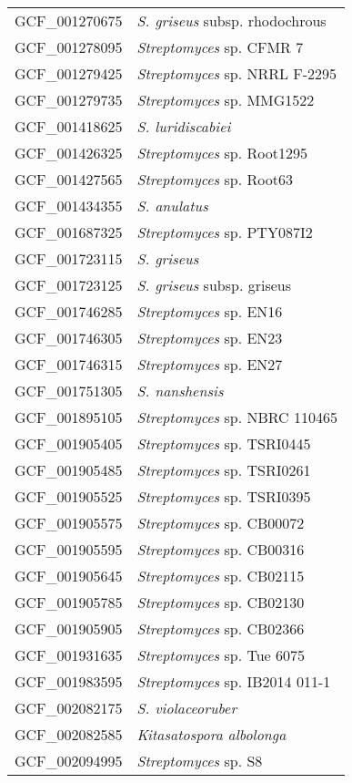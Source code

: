 \begin{longtable}{p{0.5\asdf}p{0.5\asdf}}
	GCF\_001270675 	&	\emph{S. griseus} subsp. rhodochrous	\\
	GCF\_001278095 	&	\emph{Streptomyces} sp. CFMR 7	\\
	GCF\_001279425 	&	\emph{Streptomyces} sp. NRRL F-2295	\\
	GCF\_001279735 	&	\emph{Streptomyces} sp. MMG1522	\\
	GCF\_001418625 	&	\emph{S. luridiscabiei}	\\
	GCF\_001426325 	&	\emph{Streptomyces} sp. Root1295	\\
	GCF\_001427565 	&	\emph{Streptomyces} sp. Root63	\\
	GCF\_001434355 	&	\emph{S. anulatus}	\\
	GCF\_001687325 	&	\emph{Streptomyces} sp. PTY087I2	\\
	GCF\_001723115 	&	\emph{S. griseus}	\\
	GCF\_001723125 	&	\emph{S. griseus} subsp. griseus	\\
	GCF\_001746285 	&	\emph{Streptomyces} sp. EN16	\\
	GCF\_001746305 	&	\emph{Streptomyces} sp. EN23	\\
	GCF\_001746315 	&	\emph{Streptomyces} sp. EN27	\\
	GCF\_001751305 	&	\emph{S. nanshensis}	\\
	GCF\_001895105 	&	\emph{Streptomyces} sp. NBRC 110465	\\
	GCF\_001905405 	&	\emph{Streptomyces} sp. TSRI0445	\\
	GCF\_001905485 	&	\emph{Streptomyces} sp. TSRI0261	\\
	GCF\_001905525 	&	\emph{Streptomyces} sp. TSRI0395	\\
	GCF\_001905575 	&	\emph{Streptomyces} sp. CB00072	\\
	GCF\_001905595 	&	\emph{Streptomyces} sp. CB00316	\\
	GCF\_001905645 	&	\emph{Streptomyces} sp. CB02115	\\
	GCF\_001905785 	&	\emph{Streptomyces} sp. CB02130	\\
	GCF\_001905905 	&	\emph{Streptomyces} sp. CB02366	\\
	GCF\_001931635 	&	\emph{Streptomyces} sp. Tue 6075	\\
	GCF\_001983595 	&	\emph{Streptomyces} sp. IB2014 011-1	\\
	GCF\_002082175 	&	\emph{S. violaceoruber}	\\
	GCF\_002082585 	&	\emph{Kitasatospora albolonga}	\\
	GCF\_002094995 	&	\emph{Streptomyces} sp. S8	\\

\end{longtable}
